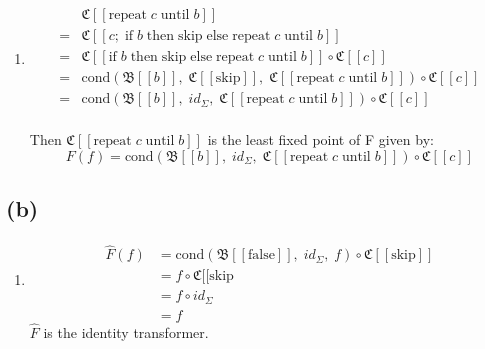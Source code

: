\documentclass[12pt]{scrartcl}
\newcommand{\lbr}{[\![}
\newcommand{\rbr}{]\!]}
\begin{document}
	\begin{enumerate}
	\item[] 
		\begin{equation*}		
		\begin{split}
			  & \mathfrak{C}\lbr \text{repeat}\;c\;\text{until}\;b\rbr\\
			= & \mathfrak{C}\lbr c;\;\text{if}\; b\; \text{then}\;\text{skip}\; \text{else}\; \text{repeat}\; c\;\text{until}\; b\rbr\\
			= & \mathfrak{C}\lbr \text{if}\; b\; \text{then}\;\text{skip}\; \text{else}\; \text{repeat}\; c\;\text{until}\; b\rbr \circ \mathfrak{C}\lbr c\rbr\\
			= & \text{cond}\left( \mathfrak{B}\lbr b\rbr ,\; \mathfrak{C} \lbr \text{skip}\rbr ,\; \mathfrak{C}\lbr \text{repeat}\;c\; \text{until}\; b\rbr \right) \circ \mathfrak{C}\lbr c\rbr\\
			= & \text{cond}\left( \mathfrak{B}\lbr b\rbr ,\; id_\Sigma ,\; \mathfrak{C}\lbr \text{repeat}\;c\; \text{until}\; b\rbr \right) \circ \mathfrak{C}\lbr c\rbr\\
		\end{split}
		\end{equation*}
		
		Then $\mathfrak{C}\lbr \text{repeat}\;c\; \text{until}\; b\rbr$ is the least fixed point of F given by:
		\begin{equation*}
		F\left( f \right) = \text{cond}\left( \mathfrak{B}\lbr b\rbr ,\; id_\Sigma ,\; \mathfrak{C}\lbr \text{repeat}\;c\; \text{until}\; b\rbr \right) \circ \mathfrak{C}\lbr c\rbr
		\end{equation*}	
	\end{enumerate}
	
	\subsection*{(b)}
	
	\begin{enumerate}
	\item[] 
		\begin{equation*}
		\begin{split}
			\hat{F}\left(f\right) & =\text{cond}\left( \mathfrak{B}\lbr \text{false}\rbr ,\; id_\Sigma ,\; f \right) \circ \mathfrak{C}\lbr \text{skip}\rbr\\
			& = f \circ \mathfrak{C}\lbr \text{skip}\\
			& = f \circ id_\Sigma\\
			& = f
		\end{split}
		\end{equation*}
		$\hat{F}$ is the identity transformer.
	\end{enumerate}		
	
\end{document}
